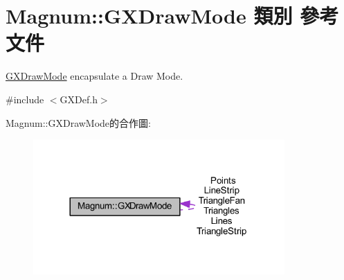 \hypertarget{class_magnum_1_1_g_x_draw_mode}{}\section{Magnum\+:\+:G\+X\+Draw\+Mode 類別 參考文件}
\label{class_magnum_1_1_g_x_draw_mode}


\hyperlink{class_magnum_1_1_g_x_draw_mode}{G\+X\+Draw\+Mode} encapsulate a Draw Mode.  




{\ttfamily \#include $<$G\+X\+Def.\+h$>$}



Magnum\+:\+:G\+X\+Draw\+Mode的合作圖\+:\nopagebreak
\begin{figure}[H]
\begin{center}
\leavevmode
\includegraphics[width=272pt]{class_magnum_1_1_g_x_draw_mode__coll__graph}
\end{center}
\end{figure}
